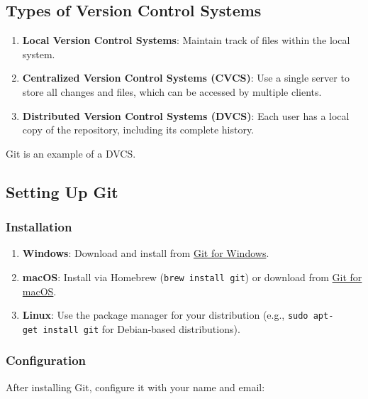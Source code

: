 \documentclass[
  letterpaper,
  DIV=11,
  numbers=noendperiod]{scrreprt}
\providecommand{\tightlist}{%
  \setlength{\itemsep}{0pt}\setlength{\parskip}{0pt}}\usepackage{longtable,booktabs,array}
\begin{document}
\subsection{Types of Version Control
Systems}\label{types-of-version-control-systems}

\begin{enumerate}
\def\labelenumi{\arabic{enumi}.}
\tightlist
\item
  \textbf{Local Version Control Systems}: Maintain track of files within
  the local system.
\item
  \textbf{Centralized Version Control Systems (CVCS)}: Use a single
  server to store all changes and files, which can be accessed by
  multiple clients.
\item
  \textbf{Distributed Version Control Systems (DVCS)}: Each user has a
  local copy of the repository, including its complete history.
\end{enumerate}

Git is an example of a DVCS.

\subsection{Setting Up Git}\label{setting-up-git}

\subsubsection{Installation}\label{installation-1}

\begin{enumerate}
\def\labelenumi{\arabic{enumi}.}
\tightlist
\item
  \textbf{Windows}: Download and install from
  \href{https://gitforwindows.org/}{Git for Windows}.
\item
  \textbf{macOS}: Install via Homebrew (\texttt{brew\ install\ git}) or
  download from \href{https://git-scm.com/download/mac}{Git for macOS}.
\item
  \textbf{Linux}: Use the package manager for your distribution (e.g.,
  \texttt{sudo\ apt-get\ install\ git} for Debian-based distributions).
\end{enumerate}

\subsubsection{Configuration}\label{configuration}

After installing Git, configure it with your name and email:
\end{document}
